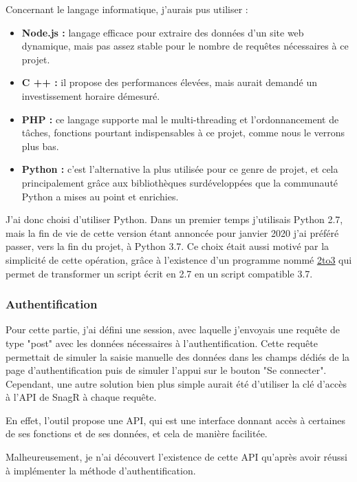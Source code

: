 Concernant le langage informatique, j'aurais pus utiliser :
\begin{itemize}
\item \textbf{Node.js :} langage efficace pour extraire des données d'un site web dynamique, mais pas assez stable pour le nombre de requêtes nécessaires à ce projet.
\item \textbf{C ++ :} il propose des performances élevées, mais aurait demandé un investissement horaire démesuré.
\item \textbf{PHP :} ce langage supporte mal le multi-threading et l'ordonnancement de tâches, fonctions pourtant indispensables à ce projet, comme nous le verrons plus bas.
\item \textbf{Python :} c'est l'alternative la plus utilisée pour ce genre de projet, et cela principalement grâce aux bibliothèques surdéveloppées que la communauté Python a mises au point et enrichies.
\end{itemize}

J'ai donc choisi d'utiliser Python. Dans un premier temps j'utilisais Python 2.7, mais la fin de vie de cette version étant annoncée pour janvier 2020 j'ai préféré passer, vers la fin du projet, à Python 3.7.
Ce choix était aussi motivé par la simplicité de cette opération, grâce à l'existence d'un programme nommé \underline{\href{https://docs.python.org/2/library/2to3.html}{2to3}} qui permet de transformer un script écrit en 2.7 en un script compatible 3.7.

\subsubsection{Authentification}

Pour cette partie, j'ai défini une session, avec laquelle j'envoyais une requête de type "post" avec les données nécessaires à l'authentification. Cette requête permettait de simuler la saisie manuelle des données dans les champs dédiés de la page d'authentification puis de simuler l'appui sur le bouton "Se connecter".
Cependant, une autre solution bien plus simple aurait été d'utiliser la clé d'accès à l'\gls{API} de \gls{SnagR} à chaque requête.

En effet, l'outil propose une \gls{API}, qui est une interface donnant accès à certaines de ses fonctions et de ses données, et cela de manière facilitée.

Malheureusement, je n'ai découvert l'existence de cette \gls{API} qu'après avoir réussi à implémenter la méthode d'authentification.

